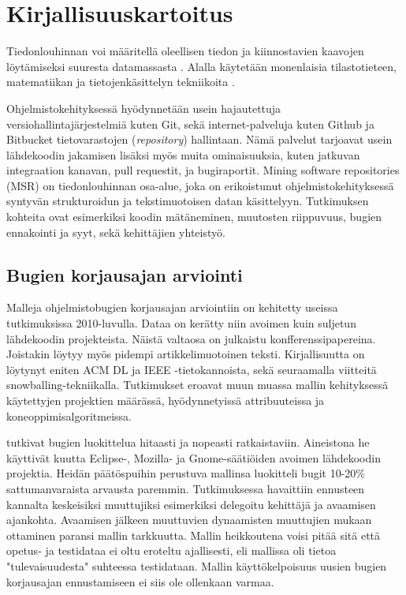 \documentclass[utf8]{gradu3}
\begin{document}
\chapter{Kirjallisuuskartoitus}


Tiedonlouhinnan voi määritellä oleellisen tiedon ja kiinnostavien kaavojen
löytämiseksi suuresta datamassasta \parencite[][8]{han-data_mining}. Alalla
käytetään monenlaisia tilastotieteen, matematiikan ja tietojenkäsittelyn
tekniikoita \parencite{clifton-2019}. 

Ohjelmistokehityksessä hyödynnetään usein hajautettuja
versiohallintajärjestelmiä kuten Git, sekä internet-palveluja kuten Github ja
Bitbucket tietovarastojen (\textit{repository}) hallintaan. Nämä palvelut
tarjoavat usein lähdekoodin jakamisen lisäksi myös muita ominaisuuksia, kuten
jatkuvan integraation kanavan, pull requestit, ja bugiraportit. Mining software
repositories (MSR) on tiedonlouhinnan osa-alue, joka on erikoistunut
ohjelmistokehityksessä syntyvän strukturoidun ja tekstimuotoisen datan
käsittelyyn. Tutkimuksen kohteita ovat esimerkiksi koodin mätäneminen, muutosten
riippuvuus, bugien ennakointi ja syyt, sekä kehittäjien yhteistyö.
\parencite{guemes-pena-emerging_topics}

\section{Bugien korjausajan arviointi}
Malleja ohjelmistobugien korjausajan arviointiin on kehitetty useissa
tutkimuksissa 2010-luvulla. Dataa on kerätty niin avoimen kuin suljetun
lähdekoodin projekteista. Näistä valtaosa on julkaistu konfferenssipapereina.
Joistakin löytyy myös pidempi artikkelimuotoinen teksti. Kirjallisuutta on
löytynyt eniten ACM DL ja IEEE -tietokannoista, sekä seuraamalla viitteitä
snowballing-tekniikalla. Tutkimukset eroavat muun muassa mallin kehityksessä
käytettyjen projektien määrässä, hyödynnetyissä attribuuteissa ja
koneoppimisalgoritmeissa.

\textcite{Giger-2010} tutkivat bugien luokittelua hitaasti ja nopeasti
ratkaistaviin. Aineistona he käyttivät kuutta Eclipse-, Mozilla- ja
Gnome-säätiöiden avoimen lähdekoodin projektia. Heidän päätöspuihin perustuva
mallinsa luokitteli bugit 10-20\% sattumanvaraista arvausta paremmin.
Tutkimuksessa havaittiin ennusteen kannalta keskeisiksi muuttujiksi esimerkiksi
delegoitu kehittäjä ja avaamisen ajankohta. Avaamisen jälkeen muuttuvien
dynaamisten muuttujien mukaan ottaminen paransi mallin tarkkuutta. Mallin
heikkoutena voisi pitää sitä että opetus- ja testidataa ei oltu eroteltu
ajallisesti, eli mallissa oli tietoa "tulevaisuudesta" suhteessa testidataan.
Mallin käyttökelpoisuus uusien bugien korjausajan ennustamiseen ei siis ole
ollenkaan varmaa.
\end{document}
